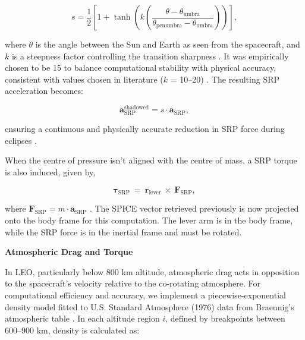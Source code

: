 \documentclass[final,3p,times,twocolumn]{elsarticle}
\begin{document}
\begin{equation}
s = \frac{1}{2} \left[ 1 + \tanh{\left( k \left( \frac{\theta - \theta_{\text{umbra}}}{\theta_{\text{penumbra}} - \theta_{\text{umbra}}} \right) \right)} \right],
\end{equation}

\noindent where \( \theta \) is the angle between the Sun and Earth as seen from the spacecraft, and \( k \) is a steepness factor controlling the transition sharpness \citep{shadow}. It was empirically chosen to be 15 to balance computational stability with physical accuracy, consistent with values chosen in literature (\( k \) = 10–20) \citep{shadow}. The resulting SRP acceleration becomes:

\begin{equation}
\mathbf{a}_{\text{SRP}}^{\text{shadowed}} = s \cdot \mathbf{a}_{\text{SRP}},
\end{equation}

\noindent ensuring a continuous and physically accurate reduction in SRP force during eclipses \citep{shadow}.

\vspace{5pt}
\par\noindent When the centre of pressure isn't aligned with the centre of mass, a SRP torque is also induced, given by,

\begin{equation}
    \boldsymbol{\tau}_{\text{SRP}} \: = \: \mathbf{r}_{\text{lever}} \: \times \: \mathbf{F}_{\text{SRP}},
    \label{eq:srp_torque}
\end{equation}

\noindent where \(\mathbf{F}_{\text{SRP}} = m \cdot \mathbf{a}_{\text{SRP}}\) \citep{torque_models}. The SPICE vector retrieved previously is now projected onto the body frame for this computation. The lever arm is in the body frame, while the SRP force is in the inertial frame and must be rotated. \vspace{7pt}

\noindent\textbf{Atmospheric Drag and Torque}\vspace{2pt}
\par\noindent In LEO, particularly below 800 km altitude, atmospheric drag acts in opposition to the spacecraft’s velocity relative to the co-rotating atmosphere. For computational efficiency and accuracy, we implement a piecewise-exponential density model fitted to U.S. Standard Atmosphere (1976) data from Braeunig’s atmospheric table \citep{braeunig_atmos}. In each altitude region \( i \), defined by breakpoints between 600–900 km, density is calculated as:
\end{document}

